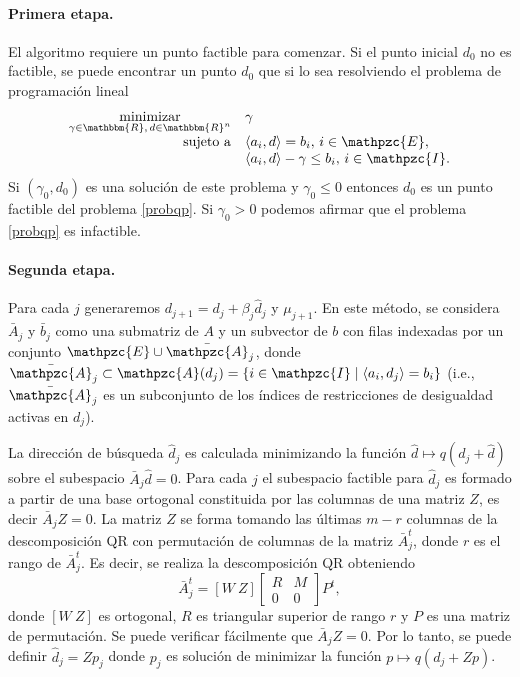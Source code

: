 \documentclass[a4paper,10pt]{book}
\newcommand{\R}{\mathbbm{R}}
\newcommand{\Rn}{\R^n}
\newcommand{\cI}{\mathpzc{I}}
\newcommand{\cE}{\mathpzc{E}}
\newcommand{\cA}{\mathpzc{A}}
\newcommand{\la}{\langle}
\newcommand{\ra}{\rangle}
\begin{document}
\paragraph{Primera etapa.}
El algoritmo requiere un punto factible para comenzar. Si el punto inicial $d_0$ no es factible, se puede encontrar un punto $d_0$ que si lo sea resolviendo el problema de programación lineal
\begin{equation}\label{eqgamma}
\begin{array}{rl}
\displaystyle \mathop{\mathrm{minimizar}}_{\gamma\in\R,\, d\in\Rn} & \gamma \\
\mathrm{sujeto \ a} & \la a_i,d\ra =b_i, \, i\in \cE,\\
                    & \la a_i,d\ra -\gamma \leq b_i, \, i\in \cI.
\end{array}
\end{equation}
Si $(\gamma_0,d_0)$ es una solución de este problema y $\gamma_0\leq 0$ entonces $d_0$ es un punto factible del problema \eqref{probqp}. Si $\gamma_0>0$ podemos afirmar que el problema \eqref{probqp} es infactible.


\paragraph{Segunda etapa.}
Para cada $j$ generaremos $d_{j+1}=d_j+\beta_j \hat d_j$ y $\mu_{j+1}$. En este método, se considera $\bar A_j$ y $\bar b_j$ como una submatriz de $A$ y un subvector de $b$ con filas indexadas por un conjunto $\cE\cup\bar\cA_j$, donde $\bar\cA_j\subset\cA(d_j)=\{i\in \cI\mid \la a_i, d_j\ra=b_i\}$ (i.e., $\bar\cA_j$ es un subconjunto de los índices de restricciones de desigualdad activas en $d_j$).


La dirección de búsqueda $\hat d_j$ es calculada minimizando la función $\hat d\mapsto q(d_j+\hat d)$ sobre el subespacio $\bar A_j \hat d =0$. Para cada $j$ el subespacio factible para $\hat d_j$ es formado a partir de una base ortogonal constituida por las columnas de una matriz $Z$, es decir $\bar A_jZ=0$. La matriz $Z$ se forma tomando las últimas $m-r$ columnas de la descomposición QR con permutación de columnas de la matriz $\bar A_j^t$, donde $r$ es el rango de $\bar A_j^t$. Es decir, se realiza la descomposición QR obteniendo
\[
 \bar A_j^t=\left[W \ Z\right] \left[\begin{array}{cc} R & M \\ 0 & 0\end{array}\right] P^t,
\]
donde $[W \ Z]$ es ortogonal, $R$ es triangular superior de rango $r$ y $P$ es una matriz de permutación. Se puede verificar fácilmente que $\bar A_jZ=0$. Por lo tanto, se puede definir $\hat d_j=Z p_j$ donde $p_j$ es solución de minimizar la función $p\mapsto q(d_j+ Z p)$.
\end{document}
